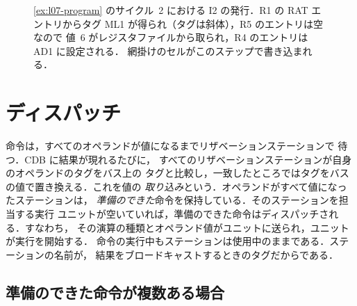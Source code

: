 \documentclass[../main.tex]{subfiles}
\begin{document}
\begin{figure}[htbp]
  \centering
  
  \caption{\cref{ex:l07-program} のサイクル~2 における I2 の発行．R1 の RAT
    エントリからタグ ML1 が得られ（タグは斜体），R5 のエントリは空なので
    値~6 がレジスタファイルから取られ，R4 のエントリは AD1 に設定される．
    網掛けのセルがこのステップで書き込まれる．}
  \label{fig:l07-issue}
\end{figure}

\section{ディスパッチ}
\label{sec:l07-dispatch}

命令は，すべてのオペランドが値になるまでリザベーションステーションで
待つ．CDB に結果が現れるたびに，
すべてのリザベーションステーションが自身のオペランドのタグをバス上の
タグと比較し，一致したところではタグをバスの値で置き換える．これを値の
\emph{取り込み}という．オペランドがすべて値になったステーションは，
\emph{準備のできた}命令を保持している．そのステーションを担当する実行
ユニットが空いていれば，準備のできた命令はディスパッチされる．すなわち，
その演算の種類とオペランド値がユニットに送られ，ユニットが実行を開始する．
命令の実行中もステーションは使用中のままである．ステーションの名前が，
結果をブロードキャストするときのタグだからである．

\subsection{準備のできた命令が複数ある場合}
\end{document}
